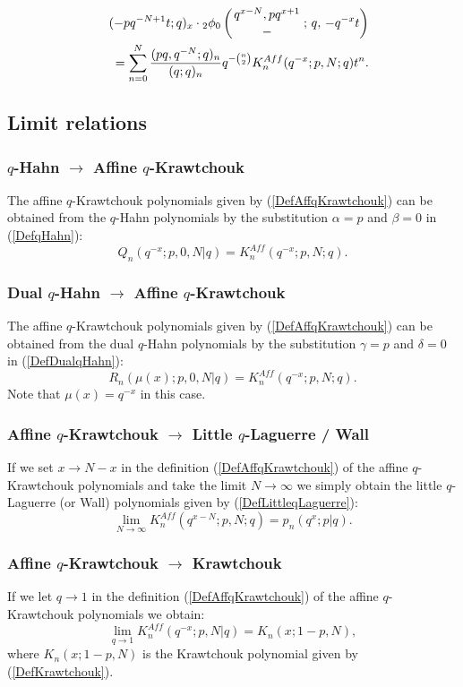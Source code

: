 \documentclass[envcountchap,graybox]{svmono}
\newcounter{rom}
\newcommand{\qhyp}[5]{\mbox{}_{#1}{\phi}_{#2}
\left(\genfrac{}{}{0pt}{}{#3}{#4}\,;\,q,\,#5\right)}
\newcommand{\qhyp}[5]{\,\mbox{}_{#1}\phi_{#2}\!\left(
  \genfrac{}{}{0pt}{}{#3}{#4};#5\right)}
\begin{document}
\begin{eqnarray}
\label{GenAffqKrawtchouk2}
& &(-pq^{-N+1}t;q)_x\cdot\qhyp{2}{0}{q^{x-N},pq^{x+1}}{-}{-q^{-x}t}\nonumber\\
& &{}=\sum_{n=0}^N\frac{(pq,q^{-N};q)_n}{(q;q)_n}q^{-\binom{n}{2}}K_n^{Aff}(q^{-x};p,N;q)t^n.
\end{eqnarray}

\subsection*{Limit relations}

\subsubsection*{$q$-Hahn $\rightarrow$ Affine $q$-Krawtchouk}
The affine $q$-Krawtchouk polynomials given by (\ref{DefAffqKrawtchouk})
can be obtained from the $q$-Hahn polynomials by the substitution $\alpha=p$ and
$\beta=0$ in (\ref{DefqHahn}):
$$Q_n(q^{-x};p,0,N|q)=K_n^{Aff}(q^{-x};p,N;q).$$

\subsubsection*{Dual $q$-Hahn $\rightarrow$ Affine $q$-Krawtchouk}
The affine $q$-Krawtchouk polynomials given by (\ref{DefAffqKrawtchouk})
can be obtained from the dual $q$-Hahn polynomials by the substitution $\gamma=p$
and $\delta=0$ in (\ref{DefDualqHahn}):
$$R_n(\mu(x);p,0,N|q)=K_n^{Aff}(q^{-x};p,N;q).$$
Note that $\mu(x)=q^{-x}$ in this case.

\subsubsection*{Affine $q$-Krawtchouk $\rightarrow$ Little $q$-Laguerre / Wall}
If we set $x\rightarrow N-x$ in the definition (\ref{DefAffqKrawtchouk})
of the affine $q$-Krawtchouk polynomials and take the limit
$N\rightarrow\infty$ we simply obtain the little $q$-Laguerre (or Wall)
polynomials given by (\ref{DefLittleqLaguerre}):
\begin{equation}
\lim_{N\rightarrow\infty}K_n^{Aff}(q^{x-N};p,N;q)=p_n(q^x;p|q).
\end{equation}

\subsubsection*{Affine $q$-Krawtchouk $\rightarrow$ Krawtchouk}
If we let $q\rightarrow 1$ in the definition (\ref{DefAffqKrawtchouk}) of the affine
$q$-Krawtchouk polynomials we obtain:
\begin{equation}
\lim_{q\rightarrow 1}K_n^{Aff}(q^{-x};p,N|q)=K_n(x;1-p,N),
\end{equation}
where $K_n(x;1-p,N)$ is the Krawtchouk polynomial given by (\ref{DefKrawtchouk}).
\end{document}

